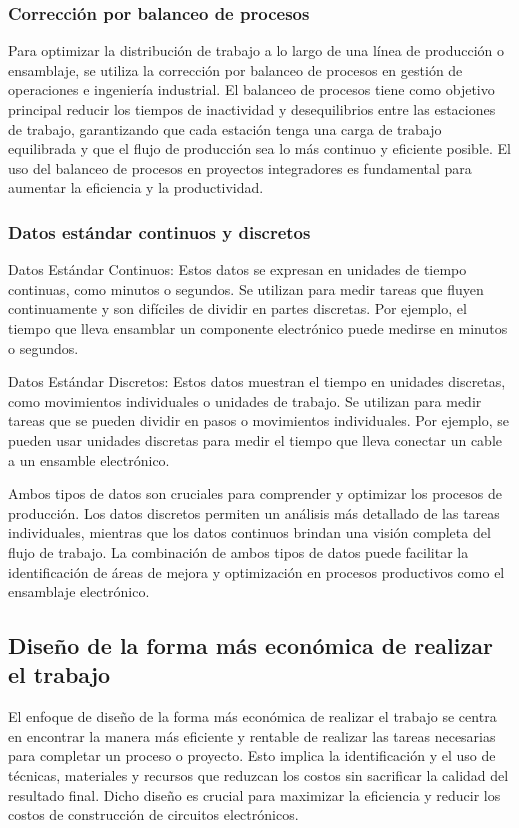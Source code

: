     \subsubsection{Corrección por balanceo de procesos}
    Para optimizar la distribución de trabajo a lo largo de una línea de producción o ensamblaje, se utiliza la corrección por balanceo de procesos en gestión de operaciones e ingeniería industrial. El balanceo de procesos tiene como objetivo principal reducir los tiempos de inactividad y desequilibrios entre las estaciones de trabajo, garantizando que cada estación tenga una carga de trabajo equilibrada y que el flujo de producción sea lo más continuo y eficiente posible. El uso del balanceo de procesos en proyectos integradores es fundamental para aumentar la eficiencia y la productividad.
    \subsubsection{Datos estándar continuos y discretos}
    Datos Estándar Continuos: Estos datos se expresan en unidades de tiempo continuas, como minutos o segundos. Se utilizan para medir tareas que fluyen continuamente y son difíciles de dividir en partes discretas. Por ejemplo, el tiempo que lleva ensamblar un componente electrónico puede medirse en minutos o segundos.
    
    Datos Estándar Discretos: Estos datos muestran el tiempo en unidades discretas, como movimientos individuales o unidades de trabajo. Se utilizan para medir tareas que se pueden dividir en pasos o movimientos individuales. Por ejemplo, se pueden usar unidades discretas para medir el tiempo que lleva conectar un cable a un ensamble electrónico.
    
    Ambos tipos de datos son cruciales para comprender y optimizar los procesos de producción. Los datos discretos permiten un análisis más detallado de las tareas individuales, mientras que los datos continuos brindan una visión completa del flujo de trabajo. La combinación de ambos tipos de datos puede facilitar la identificación de áreas de mejora y optimización en procesos productivos como el ensamblaje electrónico.
    
    \subsection{Diseño de la forma más económica de realizar el trabajo}
    El enfoque de diseño de la forma más económica de realizar el trabajo se centra en encontrar la manera más eficiente y rentable de realizar las tareas necesarias para completar un proceso o proyecto. Esto implica la identificación y el uso de técnicas, materiales y recursos que reduzcan los costos sin sacrificar la calidad del resultado final. Dicho diseño es crucial para maximizar la eficiencia y reducir los costos de construcción de circuitos electrónicos.
    
